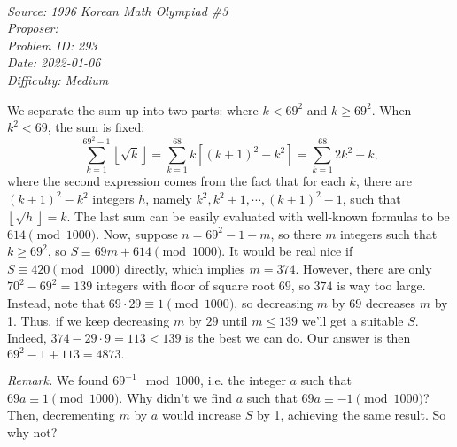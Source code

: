 \SSbreak\\
\emph{Source: 1996 Korean Math Olympiad \#3}\\
\emph{Proposer: \Pahkml}\\
\emph{Problem ID: 293}\\
\emph{Date: 2022-01-06}\\
\emph{Difficulty: Medium}\\
\SSbreak

\bigskip

\begin{solution}\hfil\medskip
  
    We separate the sum up into two parts: where $k < 69^2$ and $k \geq 69^2$. When $k^2 < 69$, 
    the sum is fixed: 
    $$\sum_{k = 1}^{69^2 - 1} \left\lfloor \sqrt{k} \right\rfloor = 
    \sum_{k = 1}^{68} k\left[(k + 1)^2 - k^2\right] = \sum_{k = 1}^{68} 2k^2 + k,$$ where the 
    second expression comes from the fact that for each $k$, there are $(k + 1)^2 - k^2$ integers $h$, 
    namely $k^2, k^2 + 1, \cdots , (k + 1)^2 - 1$, such that $\left\lfloor \sqrt{h} \right\rfloor = k$. 
    The last sum can be easily evaluated with well-known formulas to be $614 \pmod{1000}$. Now, suppose 
    $n = 69^2 - 1 + m$, so there $m$ integers such that $k \geq 69^2$, so $S \equiv 69m + 614 \pmod{1000}.$ 
    It would be real nice if $S \equiv 420 \pmod{1000}$ directly, which implies $m = 374$. However, 
    there are only $70^2 - 69^2 = 139$ integers with floor of square root $69$, so $374$ is way too large. 
    Instead, note that $69 \cdot 29 \equiv 1 \pmod{1000}$, so decreasing $m$ by $69$ decreases $m$ by 1. 
    Thus, if we keep decreasing $m$ by $29$ until $m \leq 139$ we'll get a suitable $S$. Indeed, 
    $374 - 29 \cdot 9 = 113 < 139$ is the best we can do. Our answer is then $69^2 - 1 + 113 = \boxed{4873}.$\medskip

    \textit{Remark.} We found $69^{-1} \mod{1000}$, i.e. the integer $a$ such that $69a \equiv 1 \pmod{1000}.$ 
    Why didn't we find $a$ such that $69a \equiv -1 \pmod{1000}$? Then, decrementing $m$ by $a$ would 
    increase $S$ by 1, achieving the same result. So why not?

\end{solution}\bigskip
